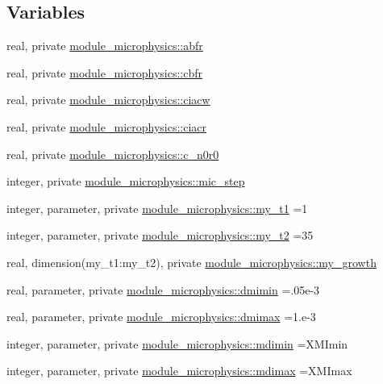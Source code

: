 \subsection*{Variables}
\begin{DoxyCompactItemize}
\item 
real, private \hyperlink{namespacemodule__microphysics_a8f4f8d798ec89d8bb550fa6b6f8eda06}{module\+\_\+microphysics\+::abfr}
\item 
real, private \hyperlink{namespacemodule__microphysics_afdcb4cd9370ca50745e65221becb6eae}{module\+\_\+microphysics\+::cbfr}
\item 
real, private \hyperlink{namespacemodule__microphysics_a9e41f7e6287fe7ede81f17b9e041c09e}{module\+\_\+microphysics\+::ciacw}
\item 
real, private \hyperlink{namespacemodule__microphysics_a1c6192a9baafa2b341b19628e00c19b5}{module\+\_\+microphysics\+::ciacr}
\item 
real, private \hyperlink{namespacemodule__microphysics_ac36c8de45d04aab21833d22133311284}{module\+\_\+microphysics\+::c\+\_\+n0r0}
\item 
integer, private \hyperlink{namespacemodule__microphysics_acb3899d31d6f2079a2d41c3e551e3443}{module\+\_\+microphysics\+::mic\+\_\+step}
\item 
integer, parameter, private \hyperlink{namespacemodule__microphysics_aae73524f22f4bc2373aaa5d8a6f7e7d6}{module\+\_\+microphysics\+::my\+\_\+t1} =1
\item 
integer, parameter, private \hyperlink{namespacemodule__microphysics_a01af6bac32c88fd12ba020f66ad0ae80}{module\+\_\+microphysics\+::my\+\_\+t2} =35
\item 
real, dimension(my\+\_\+t1\+:my\+\_\+t2), private \hyperlink{namespacemodule__microphysics_a05041f6bd94be58f8b3bddac6b374b41}{module\+\_\+microphysics\+::my\+\_\+growth}
\item 
real, parameter, private \hyperlink{namespacemodule__microphysics_a10a6db795f339c47c5afd6916d0c196b}{module\+\_\+microphysics\+::dmimin} =.\+05e-\/3
\item 
real, parameter, private \hyperlink{namespacemodule__microphysics_ab71ad8ff5f6f170585e96194373be5cc}{module\+\_\+microphysics\+::dmimax} =1.e-\/3
\item 
integer, parameter, private \hyperlink{namespacemodule__microphysics_a81bcf203ed1a75b10ea2c7f97ac56a21}{module\+\_\+microphysics\+::mdimin} =X\+M\+Imin
\item 
integer, parameter, private \hyperlink{namespacemodule__microphysics_a28b728213c1425c1bd5c05c9a469b92a}{module\+\_\+microphysics\+::mdimax} =X\+M\+Imax

\end{DoxyCompactItemize}
